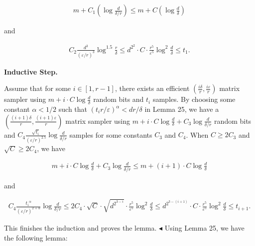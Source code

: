 \[\begin{gathered}
m+C_{1}\left(\log\frac{d}{\delta/r}\right)\leq m+C\left(\log\frac{d}{\delta}\right)
\end{gathered}\]


and\par


\[\begin{gathered}
C_{2}\frac{d^{3}}{(\varepsilon/r)^{3}}\log^{1.5}\frac{r}{\delta}\leq d^{2^{2}}\cdot C\cdot\frac{r^{5}}{\varepsilon^{5}}\log^{2}\frac{d}{\delta}\leq t_{1}.
\end{gathered}\]





\par\medskip\noindent\textbf{Inductive Step.}\par




Assume that for some $i\in[1,r-1]$, there exists an efficient $\left(\frac{i\delta}{r},\frac{i\varepsilon}{r}\right)$ matrix sampler using $m+i\cdot C\log\frac{d}{\delta}$ random bits and $t_{i}$ samples.
By choosing some constant $\alpha<1/2$ such that $(t_{i}r/\varepsilon)^{\alpha}<dr/\delta$ in Lemma 25, we have a $\left(\frac{(i+1)\delta}{r},\frac{(i+1)\varepsilon}{r}\right)$ matrix sampler using $m+i\cdot C\log\frac{d}{\delta}+C_{3}\log\frac{d}{\delta/r}$ random bits and $C_{4}\frac{\sqrt{t_{i}}}{(\varepsilon/r)^{2.5}}\log\frac{d}{\delta/r}$ samples for some constants $C_{3}$ and $C_{4}$. When $C\geq 2C_{3}$ and $\sqrt{C}\geq 2C_{4}$, we have\par


\[\begin{gathered}
m+i\cdot C\log\frac{d}{\delta}+C_{3}\log\frac{d}{\delta/r}\leq m+(i+1)\cdot C\log\frac{d}{\delta}
\end{gathered}\]


and\par


\[\begin{gathered}
C_{4}\frac{{t_{i}}^{\alpha}}{(\varepsilon/r)^{2+\alpha}}\log\frac{d}{\delta/r}\leq 2C_{4}\cdot\sqrt{C}\cdot\sqrt{d^{2^{3-i}}}\cdot\frac{r^{5}}{\varepsilon^{5}}\log^{2}\frac{d}{\delta}\leq d^{2^{3-(i+1)}}\cdot C\cdot\frac{r^{5}}{\varepsilon^{5}}\log^{2}\frac{d}{\delta}\leq t_{i+1}.
\end{gathered}\]


This finishes the induction and proves the lemma.
$\blacktriangleleft$
Using Lemma 25, we have the following lemma:\par



